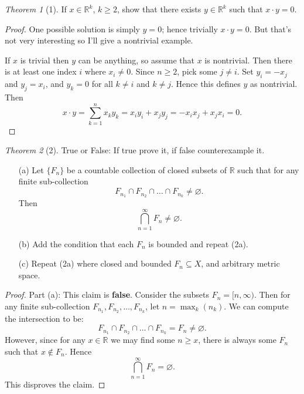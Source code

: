 \documentclass[12pt]{article}
\theoremstyle{remark}
\theoremstyle{named}
\newtheorem*{theorem}{Theorem}
\begin{document}
\begin{theorem}[1]
    If \(x \in \mathbb R^k\), \(k \ge 2\), show that there exists \(y \in \mathbb R^k\) such that \(x \cdot y = 0\).
\end{theorem}

\begin{proof}
    One possible solution is simply \(y = 0\); hence trivially \(x \cdot y = 0\). But that's not very interesting so I'll give a nontrivial example.

    If \(x\) is trivial then \(y\) can be anything, so assume that \(x\) is nontrivial. Then there is at least one index \(i\) where \(x_i \neq 0\). Since \(n \ge 2\), pick some \(j \neq i\). Set \(y_i = -x_j\) and \(y_j = x_i\), and \(y_k = 0\) for all \(k \neq i\) and \(k \neq j\). Hence this defines \(y\) as nontrivial. Then 
    \[x \cdot y = \sum_{k = 1}^n x_k y_k = x_i y_i + x_j y_j = - x_i x_j + x_j x_i = 0.\]
\end{proof}

\newpage

\begin{theorem}[2]
    True or False: If true prove it, if false counterexample it.
    \begin{enumerate}
        \item [(a)] Let \(\{F_n\}\) be a countable collection of closed subsets of \(\mathbb R\) such that for any finite sub-collection 
        \[F_{n_1} \cap F_{n_2} \cap \dots \cap F_{n_k} \neq \varnothing.\]
        Then 
        \[\bigcap_{n = 1}^\infty F_n \neq \varnothing.\]
        \item [(b)] Add the condition that each \(F_n\) is bounded and repeat (2a).
        \item [(c)] Repeat (2a) where closed and bounded \(F_n \subseteq X\), and arbitrary metric space.
    \end{enumerate}
\end{theorem}

\begin{proof}
    Part (a): This claim is \textbf{false}. Consider the subsets \(F_n = [n, \infty)\). Then for any finite sub-collection \(F_{n_1}, F_{n_2}, \dots, F_{n_k}\), let \(n = \max_{k} (n_k)\). We can compute the intersection to be: 
    \[F_{n_1} \cap F_{n_2} \cap \dots \cap F_{n_k} = F_{n} \neq \varnothing.\]
    However, since for any \(x \in \mathbb R\) we may find some \(n \ge x\), there is always some \(F_n\) such that \(x \notin F_n\). Hence 
    \[\bigcap_{n=1}^\infty F_n = \varnothing.\]
    This disproves the claim.
\end{proof}
\end{document}
